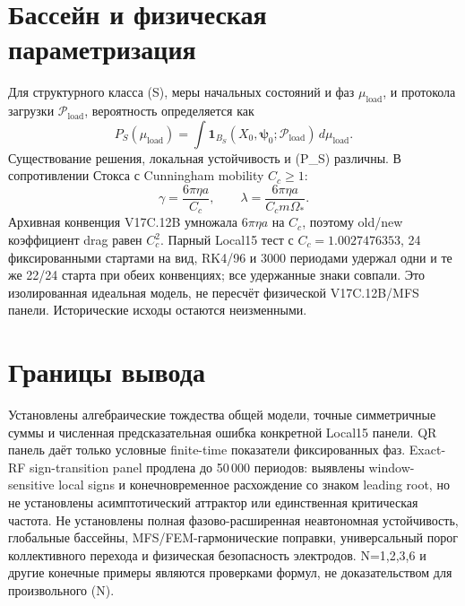 \documentclass[11pt,a4paper]{article}
\begin{document}
\section{Бассейн и физическая параметризация}
Для структурного класса (S), меры начальных состояний и фаз \(\mu_\mathrm{load}\), и протокола загрузки \(\mathcal P_\mathrm{load}\), вероятность определяется как
\[
P_S(\mu_\mathrm{load})=\int\mathbf 1_{B_S}(X_0,\boldsymbol\psi_0;\mathcal P_\mathrm{load})\,d\mu_\mathrm{load}.
\]
Существование решения, локальная устойчивость и (P_S) различны. В сопротивлении Стокса с Cunningham mobility \(C_c\ge1\):
\[
\gamma=\frac{6\pi\eta a}{C_c},\qquad
\lambda=\frac{6\pi\eta a}{C_cm\Omega_*}.
\]
Архивная конвенция V17C.12B умножала \(6\pi\eta a\) на \(C_c\), поэтому old/new коэффициент drag равен \(C_c^2\). Парный Local15 тест с \(C_c=1.0027476353\), 24 фиксированными стартами на вид, RK4/96 и 3000 периодами удержал одни и те же 22/24 старта при обеих конвенциях; все удержанные знаки совпали. Это изолированная идеальная модель, не пересчёт физической V17C.12B/MFS панели. Исторические исходы остаются неизменными.

\section{Границы вывода}
Установлены алгебраические тождества общей модели, точные симметричные суммы и численная предсказательная ошибка конкретной Local15 панели. QR панель даёт только условные finite-time показатели фиксированных фаз. Exact-RF sign-transition panel продлена до 50\,000 периодов: выявлены window-sensitive local signs и конечновременное расхождение со знаком leading root, но не установлены асимптотический аттрактор или единственная критическая частота. Не установлены полная фазово-расширенная неавтономная устойчивость, глобальные бассейны, MFS/FEM-гармонические поправки, универсальный порог коллективного перехода и физическая безопасность электродов. N=1,2,3,6 и другие конечные примеры являются проверками формул, не доказательством для произвольного (N).
\end{document}
